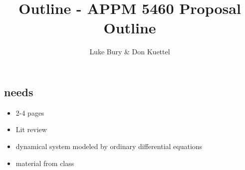 \documentclass{article}
\title{Outline - APPM 5460 Proposal Outline}
\author{Luke Bury \& Don Kuettel}
\begin{document}
\maketitle


\subsection{needs}
\begin{itemize}
  \item 2-4 pages
  \item Lit review
  \item dynamical system modeled by ordinary differential equations
  \item material from class\\\\\\
\end{itemize}
\end{document}
